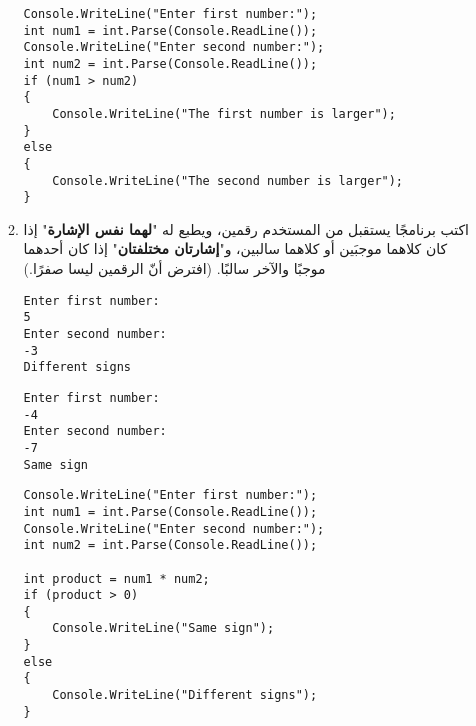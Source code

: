 ﻿\documentclass[12pt]{article}
\begin{document}
\begin{enumerate}[itemsep=3em]
\begin{enumerate}
\ifwithsols
\begin{boxSolution}
\begin{english}
\begin{verbatim}
Console.WriteLine("Enter first number:");
int num1 = int.Parse(Console.ReadLine());
Console.WriteLine("Enter second number:");
int num2 = int.Parse(Console.ReadLine());
if (num1 > num2)
{
    Console.WriteLine("The first number is larger");
}
else
{
    Console.WriteLine("The second number is larger");
}
\end{verbatim}
\end{english}
\end{boxSolution}
\fi
\clearpage
\fi

\item
اكتب برنامجًا يستقبل من المستخدم رقمين، ويطبع له "\textbf{لهما نفس الإشارة}" إذا كان كلاهما موجبَين أو كلاهما سالبين، و"\textbf{إشارتان مختلفتان}" إذا كان أحدهما موجبًا والآخر سالبًا.
(افترض أنّ الرقمين ليسا صفرًا.)
\ifdetailed
\begin{boxExample}[1]
\begin{english}
\begin{verbatim}
Enter first number:
5
Enter second number:
-3
Different signs
\end{verbatim}
\end{english}
\end{boxExample}
\begin{boxExample}[2]
\begin{english}
\begin{verbatim}
Enter first number:
-4
Enter second number:
-7
Same sign
\end{verbatim}
\end{english}
\end{boxExample}

\ifwithsols
\begin{boxSolution}
\begin{english}
\begin{verbatim}
Console.WriteLine("Enter first number:");
int num1 = int.Parse(Console.ReadLine());
Console.WriteLine("Enter second number:");
int num2 = int.Parse(Console.ReadLine());

int product = num1 * num2;
if (product > 0)
{
    Console.WriteLine("Same sign");
}
else
{
    Console.WriteLine("Different signs");
}
\end{verbatim}
\end{english}
\end{boxSolution}
\fi
\clearpage
\fi


\end{enumerate}
\end{enumerate}
\end{document}
